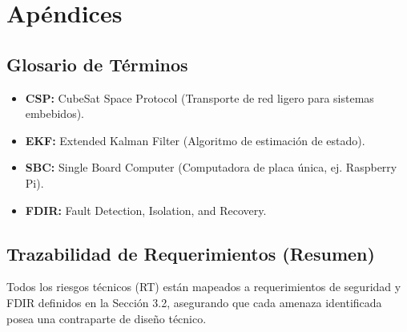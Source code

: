 \section{Apéndices}

\subsection{Glosario de Términos}
\begin{itemize}
    \item \textbf{CSP:} CubeSat Space Protocol (Transporte de red ligero para sistemas embebidos).
    \item \textbf{EKF:} Extended Kalman Filter (Algoritmo de estimación de estado).
    \item \textbf{SBC:} Single Board Computer (Computadora de placa única, ej. Raspberry Pi).
    \item \textbf{FDIR:} Fault Detection, Isolation, and Recovery.
\end{itemize}

\subsection{Trazabilidad de Requerimientos (Resumen)}
Todos los riesgos técnicos (RT) están mapeados a requerimientos de seguridad y FDIR definidos en la Sección 3.2, asegurando que cada amenaza identificada posea una contraparte de diseño técnico.
